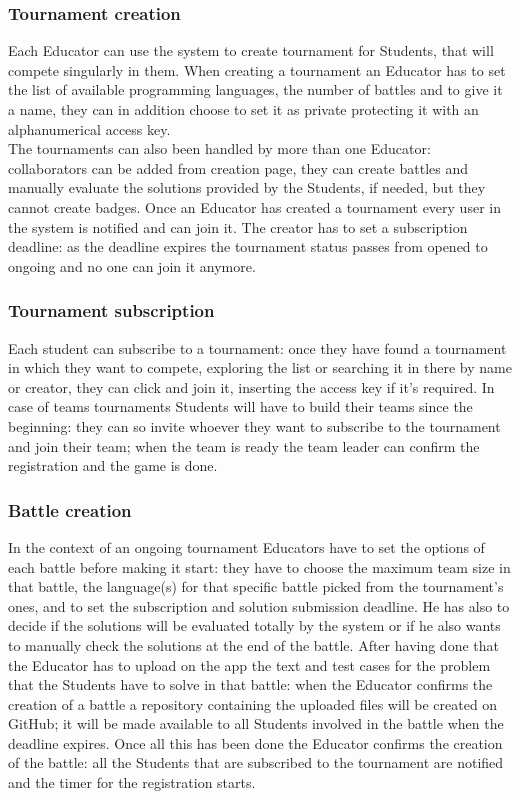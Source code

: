 \documentclass{article}
\begin{document}
\subsubsection{Tournament creation}
Each Educator can use the system to create tournament for Students, that will compete singularly in them.
When creating a tournament an Educator has to set the list of available programming languages, the number of battles and to give it a name, they can in addition choose to set it as private protecting it with an alphanumerical access key.\\
The tournaments can also been handled by more than one Educator: collaborators can be added from creation page, they can create battles and manually evaluate the solutions provided by the Students, if needed, but they cannot create badges.
Once an Educator has created a tournament every user in the system is notified and can join it.
The creator has to set a subscription deadline: as the deadline expires the tournament status passes from opened to ongoing and no one can join it anymore.
\subsubsection{Tournament subscription}
Each student can subscribe to a tournament: once they have found a tournament in which they want to compete, exploring the list or searching it in there by name or creator, they can click and join it, inserting the access key if it's required. 
In case of teams tournaments Students will have to build their teams since the beginning: they can so invite whoever they want to subscribe to the tournament and join their team; when the team is ready the team leader can confirm the registration and the game is done.
\subsubsection{Battle creation}
In the context of an ongoing tournament Educators have to set the options of each battle before making it start: they have to choose the maximum team size in that battle, the language(s) for that specific battle picked from the tournament's ones, and to set the subscription and solution submission deadline.
He has also to decide if the solutions will be evaluated totally by the system or if he also wants to manually check the solutions at the end of the battle.
After having done that the Educator has to upload on the app the text and test cases for the problem that the Students have to solve in that battle: when the Educator confirms the creation of a battle a repository containing the uploaded files will be created on GitHub; it will be made available to all Students involved in the battle when the deadline expires.
Once all this has been done the Educator confirms the creation of the battle: all the Students that are subscribed to the tournament are notified and the timer for the registration starts.
\end{document}
